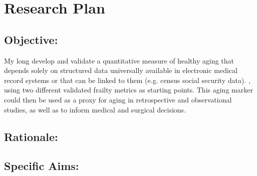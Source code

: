 \section{Research Plan }\label{research-plan}


\subsection{Objective:}\label{objective}
  
My long develop and validate a quantitative measure of healthy aging that depends solely on structured data universally available in electronic medical record systems or that can be linked to them (e.g. census social security data). ,
using two different validated frailty metrics as starting points. This
aging marker could then be used as a proxy for aging in retrospective
and observational studies, as well as to inform medical and surgical
decisions.


\subsection{Rationale:}\label{rationale}

\subsection{Specific Aims:}\label{specific-aims}
